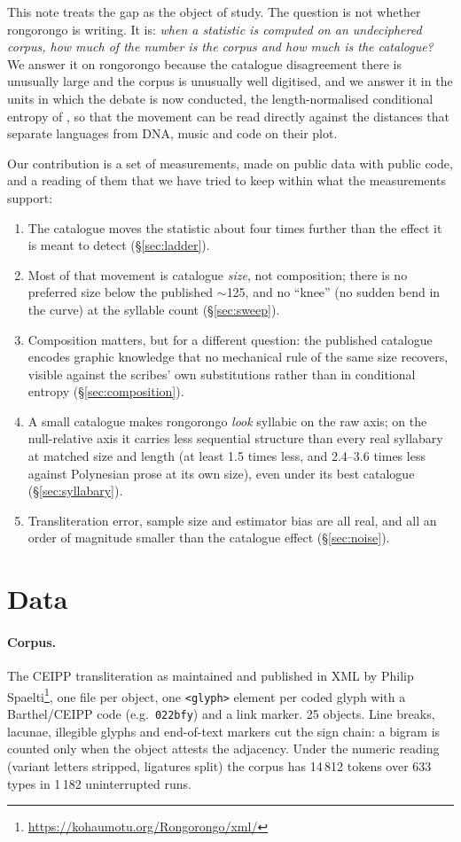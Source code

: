 \documentclass[11pt,a4paper]{article}
\begin{document}
This note treats the gap as the object of study. The question is not whether rongorongo is writing. It is: \emph{when a statistic is computed on an undeciphered corpus, how much of the number is the corpus and how much is the catalogue?} We answer it on rongorongo because the catalogue disagreement there is unusually large and the corpus is unusually well digitised, and we answer it in the units in which the debate is now conducted, the length-normalised conditional entropy of \citet{rao2010reply}, so that the movement can be read directly against the distances that separate languages from DNA, music and code on their plot.

Our contribution is a set of measurements, made on public data with public code, and a reading of them that we have tried to keep within what the measurements support:
\begin{enumerate}
\item The catalogue moves the statistic about four times further than the effect it is meant to detect (\S\ref{sec:ladder}).
\item Most of that movement is catalogue \emph{size}, not composition; there is no preferred size below the published $\sim$125, and no ``knee'' (no sudden bend in the curve) at the syllable count (\S\ref{sec:sweep}).
\item Composition matters, but for a different question: the published catalogue encodes graphic knowledge that no mechanical rule of the same size recovers, visible against the scribes' own substitutions rather than in conditional entropy (\S\ref{sec:composition}).
\item A small catalogue makes rongorongo \emph{look} syllabic on the raw axis; on the null-relative axis it carries less sequential structure than every real syllabary at matched size and length (at least 1.5 times less, and 2.4--3.6 times less against Polynesian prose at its own size), even under its best catalogue (\S\ref{sec:syllabary}).
\item Transliteration error, sample size and estimator bias are all real, and all an order of magnitude smaller than the catalogue effect (\S\ref{sec:noise}).
\end{enumerate}

\section{Data}
\label{sec:data}

\paragraph{Corpus.} The CEIPP transliteration as maintained and published in XML by Philip Spaelti\footnote{\url{https://kohaumotu.org/Rongorongo/xml/}}, one file per object, one \texttt{<glyph>} element per coded glyph with a Barthel/CEIPP code (e.g.\ \texttt{022bfy}) and a link marker. 25 objects. Line breaks, lacunae, illegible glyphs and end-of-text markers cut the sign chain: a bigram is counted only when the object attests the adjacency. Under the numeric reading (variant letters stripped, ligatures split) the corpus has 14\,812 tokens over 633 types in 1\,182 uninterrupted runs.
\end{document}
